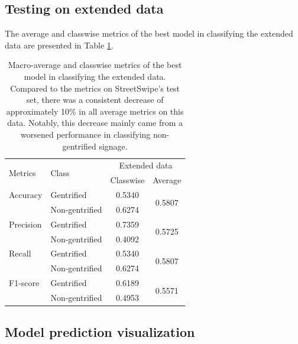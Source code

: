 \subsection{Testing on extended data}
The average and classwise metrics of the best model in classifying the extended data are presented in Table \ref{fig:resnet50_pano}.

\begin{table}[h!]
\begin{tabular}{llcc}
\toprule
\multirow{2}{*}{Metrics}   & \multirow{2}{*}{Class} & \multicolumn{2}{c}{Extended data}   \\ \cline{3-4} 
                           &                        & Classwise & Average                 \\ \hline
Accuracy                   & Gentrified             & 0.5340    & \multirow{2}{*}{0.5807} \\
                           & Non-gentrified         & 0.6274    &                         \\
Precision                  & Gentrified             & 0.7359    & \multirow{2}{*}{0.5725} \\
                           & Non-gentrified         & 0.4092    &                         \\
Recall                     & Gentrified             & 0.5340    & \multirow{2}{*}{0.5807} \\
                           & Non-gentrified         & 0.6274    &                         \\
F1-score                   & Gentrified             & 0.6189    & \multirow{2}{*}{0.5571} \\
                           & Non-gentrified         & 0.4953    &                         \\
\bottomrule
\end{tabular}
\caption{Macro-average and classwise metrics of the best model in classifying the extended data. Compared to the metrics on StreetSwipe's test set, there was a consistent decrease of approximately 10\% in all average metrics on this data. Notably, this decrease mainly came from a worsened performance in classifying non-gentrified signage.}
\label{fig:resnet50_pano}
\end{table}


\subsection{Model prediction visualization}

